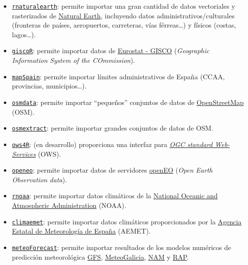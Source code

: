 \documentclass[
  spanish,
]{book}
\providecommand{\tightlist}{%
  \setlength{\itemsep}{0pt}\setlength{\parskip}{0pt}}
\theoremstyle{break}
\begin{document}
\begin{itemize}
\tightlist
\item
  \href{https://docs.ropensci.org/rnaturalearth/}{\texttt{rnaturalearth}}: permite importar una gran cantidad de datos vectoriales y rasterizados de \href{http://www.naturalearthdata.com}{Natural Earth}, incluyendo datos administrativos/culturales (fronteras de países, aeropuertos, carreteras, vías férreas\ldots) y físicos (costas, lagos\ldots).
\item
  \href{https://ec.europa.eu/eurostat/web/gisco}{\texttt{giscoR}}: permite importar datos de \href{}{Eurostat - GISCO} (\emph{Geographic Information System of the COmmission}).
\item
  \href{https://ropenspain.github.io/mapSpain}{\texttt{mapSpain}}: permite importar límites administrativos de España (CCAA, provincias, municipios\ldots).
\item
  \href{https://CRAN.R-project.org/package=osmdata}{\texttt{osmdata}}: permite importar ``pequeños'' conjuntos de datos de \href{https://www.openstreetmap.org}{OpenStreetMap} (OSM).
\item
  \href{https://CRAN.R-project.org/package=osmextract}{\texttt{osmextract}}: permite importar grandes conjuntos de datos de OSM.
\item
  \href{https://github.com/eblondel/ows4R/wiki}{\texttt{ows4R}}: (en desarrollo) proporciona una interfaz para \emph{\href{https://www.ogc.org/docs/is}{OGC standard Web-Services}} (OWS).
\item
  \href{https://open-eo.github.io/openeo-r-client}{\texttt{openeo}}: permite importar datos de servidores \href{https://openeo.org}{openEO} (\emph{Open Earth Observation data}).
\item
  \href{https://CRAN.R-project.org/package=rnoaa}{\texttt{rnoaa}}: permite importar datos climáticos de la \href{https://www.ncdc.noaa.gov/cdo-web/webservices/v2}{National Oceanic and Atmospheric Administration} (NOAA).
\item
  \href{https://ropenspain.github.io/climaemet}{\texttt{climaemet}}: permite importar datos climáticos proporcionados por la \href{https://opendata.aemet.es}{Agencia Estatal de Meteorología de España} (AEMET).
\item
  \href{https://github.com/oscarperpinan/meteoForecast}{\texttt{meteoForecast}}: permite importar resultados de los modelos numéricos de predicción meteorológica \href{https://www.ncdc.noaa.gov/data-access/model-data/model-datasets/global-forcast-system-gfs}{GFS},
  \href{https://www.meteogalicia.gal/web/modelos/threddsIndex.action}{MeteoGalicia}, \href{https://www.ncdc.noaa.gov/data-access/model-data/model-datasets/north-american-mesoscale-forecast-system-nam}{NAM} y \href{https://www.ncdc.noaa.gov/data-access/model-data/model-datasets/rapid-refresh-rap}{RAP}.

\end{itemize}
\end{document}
